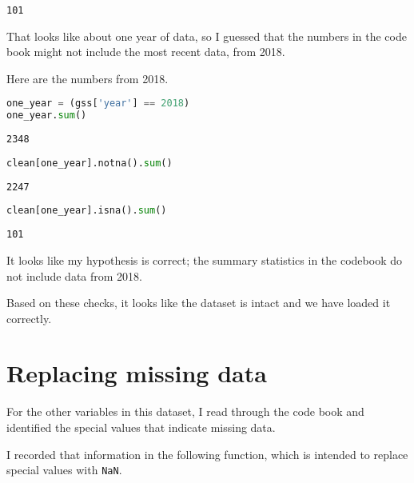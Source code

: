 \begin{lstlisting}[style=output]
101
\end{lstlisting}

That looks like about one year of data, so I guessed that the numbers in
the code book might not include the most recent data, from 2018.

Here are the numbers from 2018.

\begin{lstlisting}[language=Python,style=source]
one_year = (gss['year'] == 2018)
one_year.sum()
\end{lstlisting}

\begin{lstlisting}[style=output]
2348
\end{lstlisting}

\begin{lstlisting}[language=Python,style=source]
clean[one_year].notna().sum()
\end{lstlisting}

\begin{lstlisting}[style=output]
2247
\end{lstlisting}

\begin{lstlisting}[language=Python,style=source]
clean[one_year].isna().sum()
\end{lstlisting}

\begin{lstlisting}[style=output]
101
\end{lstlisting}

It looks like my hypothesis is correct; the summary statistics in the
codebook do not include data from 2018.

Based on these checks, it looks like the dataset is intact and we have
loaded it correctly.

\hypertarget{replacing-missing-data}{%
\section{Replacing missing data}\label{replacing-missing-data}}

For the other variables in this dataset, I read through the code book
and identified the special values that indicate missing data.

I recorded that information in the following function, which is intended
to replace special values with \passthrough{\lstinline!NaN!}.

